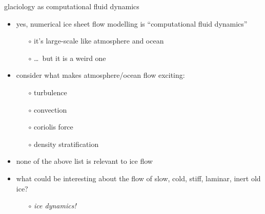 \documentclass[10pt,dvipsnames]{beamer}
\begin{document}
\begin{frame}{glaciology as computational fluid dynamics}

\begin{itemize}
\item \alert{yes}, numerical ice sheet flow modelling is ``computational fluid dynamics''
  \begin{itemize}
  \item[$\circ$] it's large-scale like atmosphere and ocean
  \item[$\circ$] \dots\, but it is a weird one
  \end{itemize}
\item consider what makes atmosphere/ocean flow exciting:
  \begin{itemize}
  \item[$\circ$] turbulence
  \item[$\circ$] convection
  \item[$\circ$] coriolis force
  \item[$\circ$] density stratification
  \end{itemize}
\item none of the above list is relevant to ice flow
\item what could be interesting about the flow of slow, cold, stiff, laminar, inert old ice?
  \begin{itemize}
  \item[$\circ$] \emph{ice dynamics!}
  \end{itemize}
\end{itemize}
\end{frame}
\end{document}
